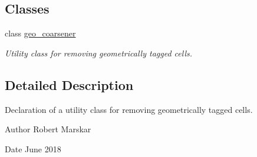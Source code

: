 \subsection*{Classes}
\begin{DoxyCompactItemize}
\item 
class \hyperlink{classgeo__coarsener}{geo\+\_\+coarsener}
\begin{DoxyCompactList}\small\item\em Utility class for removing geometrically tagged cells. \end{DoxyCompactList}\end{DoxyCompactItemize}


\subsection{Detailed Description}
Declaration of a utility class for removing geometrically tagged cells. 

\begin{DoxyAuthor}{Author}
Robert Marskar 
\end{DoxyAuthor}
\begin{DoxyDate}{Date}
June 2018 
\end{DoxyDate}
